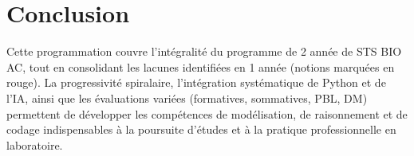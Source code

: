 \documentclass[a4paper,12pt]{article}
\begin{document}
\section*{Conclusion}
Cette programmation couvre l’intégralité du programme de 2 année de STS BIO AC, tout en consolidant les lacunes identifiées en 1 année (notions marquées en rouge). La progressivité spiralaire, l’intégration systématique de Python et de l’IA, ainsi que les évaluations variées (formatives, sommatives, PBL, DM) permettent de développer les compétences de modélisation, de raisonnement et de codage indispensables à la poursuite d’études et à la pratique professionnelle en laboratoire.
\end{document}
